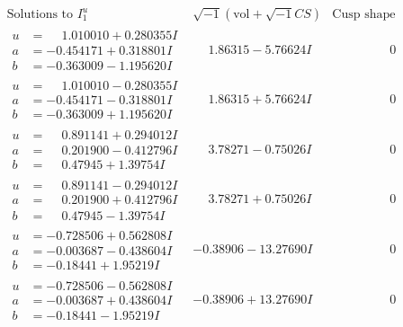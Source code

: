 \documentclass[1p]{elsarticle_modified}
\theoremstyle{definition}
\newcommand{\I}{\sqrt{-1}}
\begin{document}
$$\begin{array}{c|c|c}  
\text{Solutions to }I^u_{1}& \I (\text{vol} + \sqrt{-1}CS) & \text{Cusp shape}\\
 \hline 
\begin{aligned}
u &= \phantom{-}1.010010 + 0.280355 I \\
a &= -0.454171 + 0.318801 I \\
b &= -0.363009 - 1.195620 I\end{aligned}
 & \phantom{-}1.86315 - 5.76624 I & \phantom{-0.000000 } 0 \\ \hline\begin{aligned}
u &= \phantom{-}1.010010 - 0.280355 I \\
a &= -0.454171 - 0.318801 I \\
b &= -0.363009 + 1.195620 I\end{aligned}
 & \phantom{-}1.86315 + 5.76624 I & \phantom{-0.000000 } 0 \\ \hline\begin{aligned}
u &= \phantom{-}0.891141 + 0.294012 I \\
a &= \phantom{-}0.201900 - 0.412796 I \\
b &= \phantom{-}0.47945 + 1.39754 I\end{aligned}
 & \phantom{-}3.78271 - 0.75026 I & \phantom{-0.000000 } 0 \\ \hline\begin{aligned}
u &= \phantom{-}0.891141 - 0.294012 I \\
a &= \phantom{-}0.201900 + 0.412796 I \\
b &= \phantom{-}0.47945 - 1.39754 I\end{aligned}
 & \phantom{-}3.78271 + 0.75026 I & \phantom{-0.000000 } 0 \\ \hline\begin{aligned}
u &= -0.728506 + 0.562808 I \\
a &= -0.003687 - 0.438604 I \\
b &= -0.18441 + 1.95219 I\end{aligned}
 & -0.38906 - 13.27690 I & \phantom{-0.000000 } 0 \\ \hline\begin{aligned}
u &= -0.728506 - 0.562808 I \\
a &= -0.003687 + 0.438604 I \\
b &= -0.18441 - 1.95219 I\end{aligned}
 & -0.38906 + 13.27690 I & \phantom{-0.000000 } 0 \\ \hline\begin{aligned}

\end{aligned}
\end{array}$$
\end{document}
